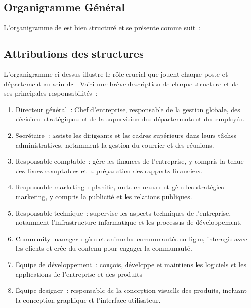 \subsection{Organigramme Général}
L’organigramme de \firm est bien structuré et se présente comme suit :






\subsection{Attributions des structures}
L’organigramme ci-dessus illustre le rôle crucial que jouent chaque poste et
département au sein de \firm. Voici une brève description de chaque
structure et de ses principales responsabilités :
\begin{enumerate}
  \item Directeur général : Chef d’entreprise, responsable de la gestion globale,
    des décisions stratégiques et de la supervision des départements et des employés.

  \item Secrétaire : assiste les dirigeants et les cadres supérieurs dans leurs
    tâches administratives, notamment la gestion du courrier et des réunions.

  \item Responsable comptable : gère les finances de l’entreprise, y compris la
    tenue des livres comptables et la préparation des rapports financiers.

  \item Responsable marketing : planifie, mets en œuvre et gère les stratégies
    marketing, y compris la publicité et les relations publiques.

  \item Responsable technique : supervise les aspects techniques de l’entreprise,
    notamment l’infrastructure informatique et les processus de développement.

  \item Community manager : gère et anime les communautés en ligne, interagis
    avec les clients et crée du contenu pour engager la communauté.

  \item Équipe de développement : conçois, développe et maintiens les logiciels
    et les applications de l’entreprise et des produits.

  \item Équipe designer : responsable de la conception visuelle des produits,
    incluant la conception graphique et l’interface utilisateur.

\end{enumerate}

